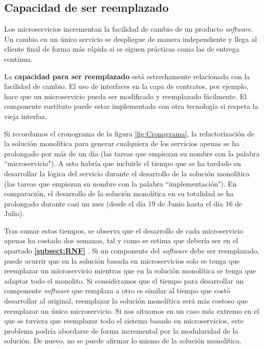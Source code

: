 \documentclass[11pt,spanish,listoffigures]{tfgetsinf}
\begin{document}
\subsection{Capacidad de ser reemplazado}

Los microservicios incrementan la facilidad de cambio de un producto \textit{software}. Un cambio en un único servicio se despliegue de manera independiente y llega al cliente final de forma más rápida si se siguen prácticas como las de entrega continua.

La \textbf{capacidad para ser reemplazado} está estrechamente relacionada con la facilidad de cambio. El uso de interfaces en la capa de contratos, por ejemplo, hace que un microservicio pueda ser modificado y reemplazado fácilmente. El componente sustituto puede estar implementada con otra tecnología si respeta la vieja interfaz.

Si recordamos el cronograma de la figura \ref{fig:Cronograma}, la refactorización de la solución monolítica para generar cualquiera de los servicios apenas se ha prolongado por más de un día (las tareas que empiezan su nombre con la palabra ``microservicio"). A esto habría que incluirle el tiempo que se ha tardado en desarrollar la lógica del servicio durante el desarrollo de la solución monolítica (las tareas que empiezan su nombre con la palabra ``implementación"). En comparación, el desarrollo de la solución monolítica en su totalidad se ha prolongado durante casi un mes (desde el día 19 de Junio hasta el día 16 de Julio).

Tras sumar estos tiempos, se observa que el desarrollo de cada microservicio apenas ha costado dos semanas, tal y como se estima que debería ser en el apartado \textbf{\ref{subsect:RNF} }. Si un componente del \textit{software} debe ser reemplazado, puede ocurrir que en la solución basada en microservicios solo se tenga que reemplazar un microservicio mientras que en la solución monolítica se tenga que adaptar todo el monolito. Si consideramos que el tiempo para desarrollar un componente \textit{software} que remplaza a otro es similar al tiempo que costó desarrollar al original, reemplazar la solución monolítica será más costoso que reemplazar un único microservicio. Si nos situamos en un caso más extremo en el que se tuviera que reemplazar todo el sistema basado en microservicios, este problema podría abordarse de forma incremental por la modularidad de la solución. De nuevo, no se puede afirmar lo mismo de la solución monolítica.
\end{document}
